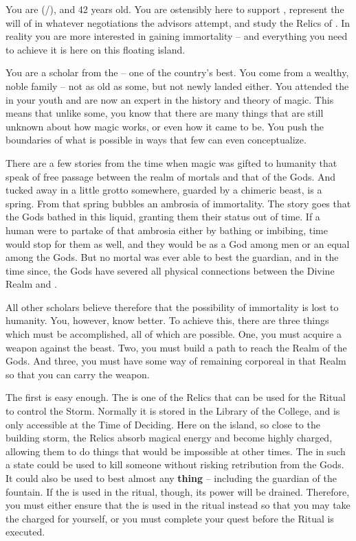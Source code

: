 \documentclass[char]{GL2020}
\begin{document}
\name{\cWildCard{}}

You are \cWildCard{\full} (\cWildCard{\they}/\cWildCard{\them}), and 42 years old. You are ostensibly here to support \cEvil{\full}, represent the will of \cQueen{\Majesty} \cQueen{} in whatever negotiations the advisors attempt, and study the Relics of \pEarth{}. In reality you are more interested in gaining immortality -- and everything you need to achieve it is here on this floating island.

You are a scholar from the\pFarm{} -- one of the country’s best. You come from a wealthy, noble family -- not as old as some, but not newly landed either. You attended the \pSchool{} in your youth and are now an expert in the history and theory of magic. This means that unlike some, you know that there are many things that are still unknown about how magic works, or even how it came to be. You push the boundaries of what is possible in ways that few can even conceptualize.

There are a few stories from the time when magic was gifted to humanity that speak of free passage between the realm of mortals and that of the Gods. And tucked away in a little grotto somewhere, guarded by a chimeric beast, is a spring. From that spring bubbles an ambrosia of immortality. The story goes that the Gods bathed in this liquid, granting them their status out of time. If a human were to partake of that ambrosia either by bathing or imbibing, time would stop for them as well, and they would be as a God among men or an equal among the Gods. But no mortal was ever able to best the guardian, and in the time since, the Gods have severed all physical connections between the Divine Realm and \pEarth{}.

All other scholars believe therefore that the possibility of immortality is lost to humanity. You, however, know better. To achieve this, there are three things which must be accomplished, all of which are possible. One, you must acquire a weapon against the beast. Two, you must build a path to reach the Realm of the Gods.  And three, you must have some way of remaining corporeal in that Realm so that you can carry the weapon.

The first is easy enough. The \iScythe{} is one of the \pFarm{} Relics that can be used for the Ritual to control the Storm. Normally it is stored in the Library of the College, and is only accessible at the Time of Deciding. Here on the island, so close to the building storm, the Relics absorb magical energy and become highly charged, allowing them to do things that would be impossible at other times. The \iScythe{} in such a state could be used to kill someone without risking retribution from the Gods. It could also be used to best almost any \textbf{thing} -- including the guardian of the fountain. If the \iScythe{} is used in the ritual, though, its power will be drained. Therefore, you must either ensure that the \iPitcher{} is used in the ritual instead so that you may take the charged \iScythe{} for yourself, or you must complete your quest before the Ritual is executed.
\end{document}
